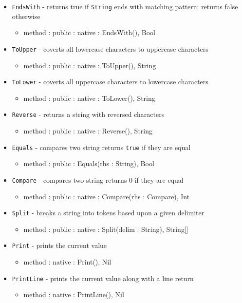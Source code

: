 \documentclass[12pt]{article}
\begin{document}
\begin{itemize}
\item \texttt{EndsWith} - returns true if \texttt{String} ends with matching pattern; returns false otherwise
  \begin{itemize}
  \item method : public : native : EndsWith(), Bool
  \end{itemize}
\item \texttt{ToUpper} - coverts all lowercase characters to uppercase characters
  \begin{itemize}
  \item method : public : native : ToUpper(), String
  \end{itemize}
\item \texttt{ToLower} - coverts all uppercase characters to lowercase characters
  \begin{itemize}
  \item method : public : native : ToLower(), String
  \end{itemize}
\item \texttt{Reverse} - returns a string with reversed characters
  \begin{itemize}
  \item method : public : native : Reverse(), String
  \end{itemize}
\item \texttt{Equals} - compares two string returns \texttt{true} if they are equal
  \begin{itemize}
  \item method : public : Equals(rhs : String), Bool
  \end{itemize}
\item \texttt{Compare} - compares two string returns 0 if they are equal
  \begin{itemize}
  \item method : public : native : Compare(rhs : Compare), Int
  \end{itemize} 
\item \texttt{Split} - breaks a string into tokens based upon a given delimiter
  \begin{itemize}
  \item method : public : native : Split(delim : String), String[]
  \end{itemize}
\item \texttt{Print} - prints the current value
  \begin{itemize}
  \item method : native : Print(), Nil
  \end{itemize}
\item \texttt{PrintLine} - prints the current value along with a line return
  \begin{itemize}
  \item method : native : PrintLine(), Nil
  \end{itemize}
\end{itemize}
\end{document}

